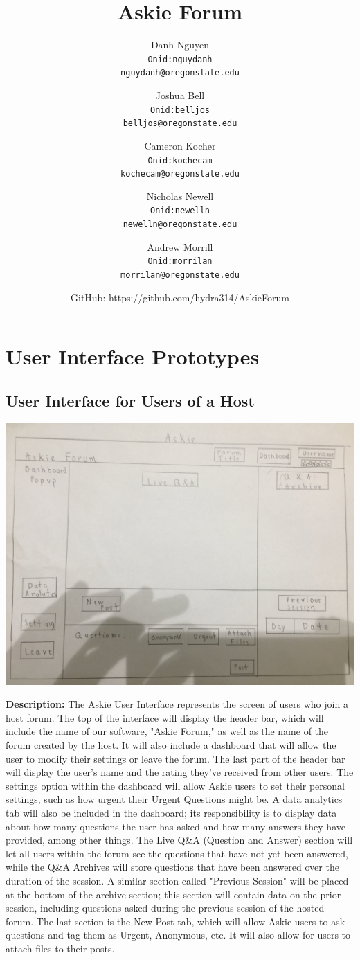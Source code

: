 \documentclass[12pt]{article}
\title{Askie Forum}
\author{
         Danh Nguyen\\
         \texttt{Onid:nguydanh}\\
         \texttt{nguydanh@oregonstate.edu}
         \and
         Joshua Bell\\
         \texttt{Onid:belljos}\\
         \texttt{belljos@oregonstate.edu}
         \and
         Cameron Kocher\\
         \texttt{Onid:kochecam}\\
         \texttt{kochecam@oregonstate.edu}
         \and
         Nicholas Newell\\
         \texttt{Onid:newelln}\\
         \texttt{newelln@oregonstate.edu}
         \and
         Andrew Morrill\\
         \texttt{Onid:morrilan}\\
         \texttt{morrilan@oregonstate.edu}
         \and
         GitHub: https://github.com/hydra314/AskieForum
    }
\begin{document}
\maketitle

\tableofcontents
\section{User Interface Prototypes}
        \subsection{User Interface for Users of a Host}        
\begin{flushleft}
\includegraphics[width=\textwidth]{Assignment_3_UIP1}
\end{flushleft}
\begin{flushleft}
\textbf{Description:} The Askie User Interface represents the screen of users who join a host forum. The top of the interface will display the header bar, which will include the name of our software, "Askie Forum," as well as the name of the forum created by the host. It will also include a dashboard that will allow the user to modify their settings or leave the forum. The last part of the header bar will display the user's name and the rating they've received from other users. The settings option within the dashboard will allow Askie users to set their personal settings, such as how urgent their Urgent Questions might be. A data analytics tab will also be included in the dashboard; its responsibility is to display data about how many questions the user has asked and how many answers they have provided, among other things. The Live Q\&A (Question and Answer) section will let all users within the forum see the questions that have not yet been answered, while the Q\&A Archives will store questions that have been answered over the duration of the session. A similar section called "Previous Session" will be placed at the bottom of the archive section; this section will contain data on the prior session, including questions asked during the previous session of the hosted forum. The last section is the New Post tab, which will allow Askie users to ask questions and tag them as Urgent, Anonymous, etc. It will also allow for users to attach files to their posts. 
\end{flushleft}
\end{document}
